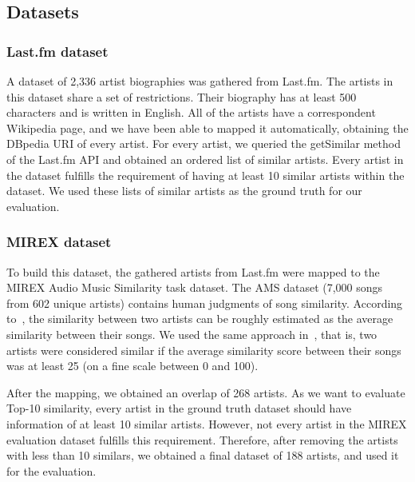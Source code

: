 \subsection{Datasets}

\subsubsection{Last.fm dataset}\label{sec:lastfm_dataset}

A dataset of 2,336 artist biographies was gathered from Last.fm. The artists in this dataset share a set of restrictions.
Their biography has at least 500 characters and is written in English.
All of the artists have a correspondent Wikipedia page, and we have been able to mapped it automatically, obtaining the DBpedia URI of every artist.
For every artist, we queried the getSimilar method of the Last.fm API and obtained an ordered list of similar artists. Every artist in the dataset fulfills the requirement of having at least 10 similar artists within the dataset.
We used these lists of similar artists as the ground truth for our evaluation.

\subsubsection{MIREX dataset} %

To build this dataset, the gathered artists from Last.fm
were mapped to the MIREX Audio Music Similarity task dataset. The AMS dataset (7,000 songs from 602 unique artists) contains human judgments of song similarity. According to~\cite{Schedl2013}, the similarity between two artists can be roughly estimated as the average similarity between their songs. We used the same approach in~\cite{Schedl2013}, that is, two artists were considered similar if the average similarity score between their songs was at least 25 (on a fine scale between 0 and 100).

After the mapping, we obtained an overlap of 268 artists.
As we want to evaluate Top-10 similarity, every artist in the ground truth dataset should have information of at least 10 similar artists. However, not every artist in the MIREX evaluation dataset fulfills this requirement. Therefore, after removing the artists with less than 10 similars, we obtained a final dataset of 188 artists, and used it for the evaluation.

